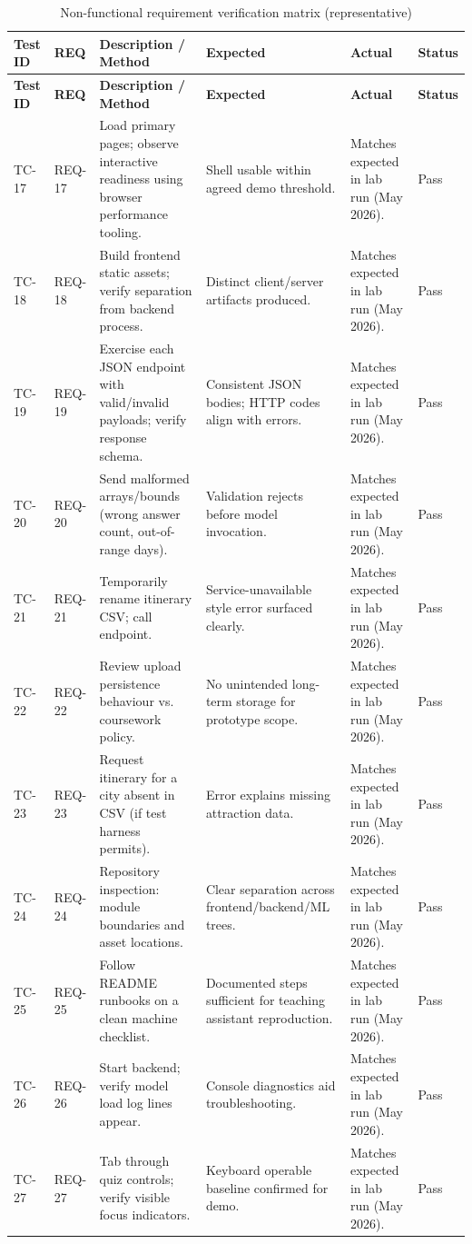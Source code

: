 \documentclass[12pt,oneside,openany]{report}
\begin{document}
\begin{longtable}{|p{}|p{}|p{}|p{}|p{}|p{}|}
\caption{Non-functional requirement verification matrix (representative)\label{tab:tests-nf}}\\
\hline
\textbf{Test ID} & \textbf{REQ} & \textbf{Description / Method} & \textbf{Expected} & \textbf{Actual} & \textbf{Status} \\
\hline
\endfirsthead
\hline
\textbf{Test ID} & \textbf{REQ} & \textbf{Description / Method} & \textbf{Expected} & \textbf{Actual} & \textbf{Status} \\
\hline
\endhead
\hline
\endfoot

TC-17 & REQ-17 & Load primary pages; observe interactive readiness using browser performance tooling. & Shell usable within agreed demo threshold. & Matches expected in lab run (May 2026). & Pass \\
\hline
TC-18 & REQ-18 & Build frontend static assets; verify separation from backend process. & Distinct client/server artifacts produced. & Matches expected in lab run (May 2026). & Pass \\
\hline
TC-19 & REQ-19 & Exercise each JSON endpoint with valid/invalid payloads; verify response schema. & Consistent JSON bodies; HTTP codes align with errors. & Matches expected in lab run (May 2026). & Pass \\
\hline
TC-20 & REQ-20 & Send malformed arrays/bounds (wrong answer count, out-of-range days). & Validation rejects before model invocation. & Matches expected in lab run (May 2026). & Pass \\
\hline
TC-21 & REQ-21 & Temporarily rename itinerary CSV; call endpoint. & Service-unavailable style error surfaced clearly. & Matches expected in lab run (May 2026). & Pass \\
\hline
TC-22 & REQ-22 & Review upload persistence behaviour vs. coursework policy. & No unintended long-term storage for prototype scope. & Matches expected in lab run (May 2026). & Pass \\
\hline
TC-23 & REQ-23 & Request itinerary for a city absent in CSV (if test harness permits). & Error explains missing attraction data. & Matches expected in lab run (May 2026). & Pass \\
\hline
TC-24 & REQ-24 & Repository inspection: module boundaries and asset locations. & Clear separation across frontend/backend/ML trees. & Matches expected in lab run (May 2026). & Pass \\
\hline
TC-25 & REQ-25 & Follow README runbooks on a clean machine checklist. & Documented steps sufficient for teaching assistant reproduction. & Matches expected in lab run (May 2026). & Pass \\
\hline
TC-26 & REQ-26 & Start backend; verify model load log lines appear. & Console diagnostics aid troubleshooting. & Matches expected in lab run (May 2026). & Pass \\
\hline
TC-27 & REQ-27 & Tab through quiz controls; verify visible focus indicators. & Keyboard operable baseline confirmed for demo. & Matches expected in lab run (May 2026). & Pass \\
\hline
\end{longtable}
\end{document}
